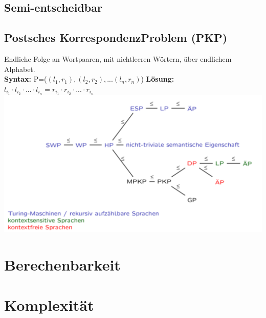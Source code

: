 \documentclass[12pt,a4paper]{article}
\begin{document}
	\subsection{Semi-entscheidbar}

	\subsection{Postsches KorrespondenzProblem (PKP)}
		Endliche Folge an Wortpaaren, mit nichtleeren Wörtern, über endlichem Alphabet.\\
		\textbf{Syntax:} P=($(l_1, r_1), (l_2, r_2), ...(l_n, r_n)$) \hfill \textbf{Lösung:} $l_{i_1} \cdot l_{i_2} \cdot ... \cdot l_{i_n} = r_{i_1} \cdot r_{i_2} \cdot ... \cdot r_{i_n}$
	\includegraphics[scale=0.4]{Bilder/Zusammenfassung_Unentscheidbarkeiten.png}

\section{Berechenbarkeit}

\section{Komplexität}
\end{document}
